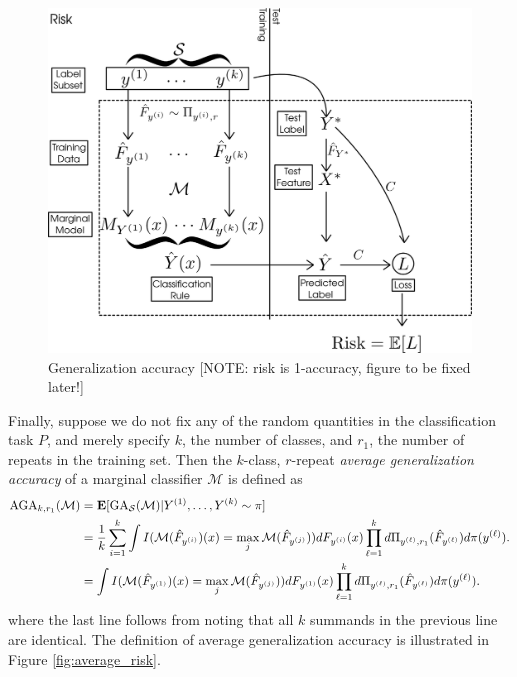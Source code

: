 \begin{figure}[h]
\centering
\includegraphics[scale = 0.3]{../extrapolation_figures/risk.png}
\caption{Generalization accuracy [NOTE: risk is 1-accuracy, figure to be fixed later!]}\label{fig:risk}
\end{figure}

Finally, suppose we do not fix any of the random quantities in the
classification task $P$, and merely specify $k$, the number of
classes, and $r_1$, the number of repeats in the training set.  
Then the $k$-class, $r$-repeat \emph{average generalization accuracy} of
a marginal classifier $\mathcal{M}$ is defined as
\begin{align*}
\text{AGA}_{k,r_1}(\mathcal{M}) &= \textbf{E}[\text{GA}_{\mathcal{S}}(\mathcal{M})|Y^{(1)}, \hdots, Y^{(k)} \sim \pi]
\\&= \frac{1}{k} \sum_{i=1}^k \int
I(\mathcal{M}(\hat{F}_{y^{(i)}})(x) = \max_j
\mathcal{M}(\hat{F}_{y^{(j)}})) dF_{y^{(i)}}(x) \prod_{\ell=1}^k
d\Pi_{y^{(\ell)}, r_1}(\hat{F}_{y^{(\ell)}}) d\pi(y^{(\ell)}).
\\&= \int
I(\mathcal{M}(\hat{F}_{y^{(1)}})(x) = \max_j
\mathcal{M}(\hat{F}_{y^{(j)}})) dF_{y^{(1)}}(x) \prod_{\ell=1}^k
d\Pi_{y^{(\ell)}, r_1}(\hat{F}_{y^{(\ell)}}) d\pi(y^{(\ell)}).
\end{align*}
where the last line follows from noting that all $k$ summands in the previous line are identical.
The definition of average generalization accuracy is illustrated in Figure \ref{fig:average_risk}.

